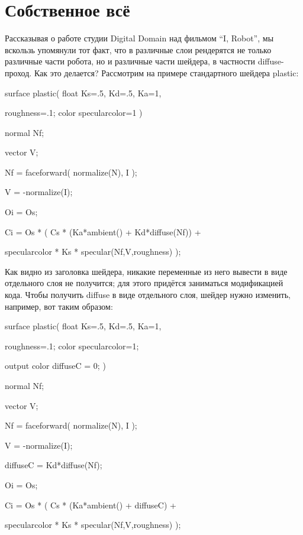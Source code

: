 \chapter*{Собственное всё}
  

 Рассказывая о работе студии Digital Domain над
    фильмом “I, Robot”, мы вскользь упомянули тот факт, что в различные
    слои рендерятся не только различные части робота, но и различные
    части шейдера, в частности diffuse-проход. Как это делается?
    Рассмотрим на примере стандартного шейдера plastic:
  

surface plastic( float Ks=.5, Kd=.5, Ka=1,
  

                  roughness=.1;
    color specularcolor=1 )
  

{
  

     normal Nf;
  

     vector V;
  

     Nf = faceforward( normalize(N), I
    );
  

     V = -normalize(I);
  

     Oi = Os;
  

     Ci = Os * ( Cs * (Ka*ambient() +
    Kd*diffuse(Nf)) +
  

             specularcolor *
    Ks * specular(Nf,V,roughness) );
  

 }
  

 Как видно из заголовка шейдера, никакие переменные
    из него вывести в виде отдельного слоя не получится; для этого
    придётся заниматься модификацией кода. Чтобы получить diffuse в
    виде отдельного слоя, шейдер нужно изменить, например, вот таким
    образом:
  

surface
    plastic( float Ks=.5, Kd=.5, Ka=1,
  

                  roughness=.1; color specularcolor=1;
  

                  output color diffuseC = 0; )
  

{
  

     normal Nf;
  

     vector V;
  

     Nf = faceforward( normalize(N), I
    );
  

     V = -normalize(I);
  

     diffuseC = Kd*diffuse(Nf);
  

     Oi = Os;
  

     Ci = Os * ( Cs * (Ka*ambient() +
    diffuseC) +
  

             specularcolor *
    Ks * specular(Nf,V,roughness) );
  

 }
  

